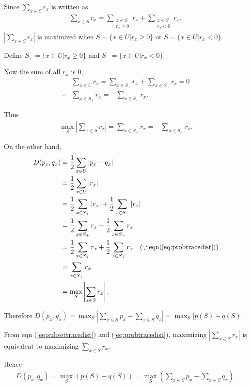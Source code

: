 Since $\sum_{x \in S} r_x $ is written as
\begin{align}
	\sum_{x \in S} r_x = \sum_{\substack{x \in S\\  r_x \geq 0}} r_x + \sum_{\substack{x \in S\\ r_x < 0}} r_x,\label{eq:subsettracedist}
\end{align}
$\left|\sum_{x \in S} r_x \right|$ is maximized when $S = \{x \in U | r_x \geq 0  \}$ or $S = \{x \in U | r_x < 0  \}$.

Define $S_+ = \{x \in U | r_x \geq 0  \}$ and $S_- = \{x \in U | r_x < 0  \}$.

Now the sum of all $r_x$ is 0,
\begin{align*}
	&\sum_{x \in U} r_x = \sum_{x \in S_+} r_x + \sum_{x \in S_-} r_x = 0\\
	\therefore &\sum_{x \in S_+} r_x = - \sum_{x \in S_-} r_x.
\end{align*} 

Thus
\begin{align}
	\max_S \left|\sum_{x \in S} r_x \right| = \sum_{x \in S_+} r_x = - \sum_{x \in S_-} r_x \label{eq:probtracedist}.
\end{align}

On the other hand,
\begin{align}
	D(p_x, q_x) &= \frac{1}{2} \sum_{x \in U} |p_x - q_x|\nonumber\\
		&= \frac{1}{2} \sum_{x \in U} |r_x|\nonumber\\
		&= \frac{1}{2} \sum_{x \in S_+} |r_x| + \frac{1}{2} \sum_{x \in S_-} |r_x|\nonumber\\
		&= \frac{1}{2} \sum_{x \in S_+} r_x - \frac{1}{2} \sum_{x \in S_-} r_x\nonumber\\
		&= \frac{1}{2} \sum_{x \in S_+} r_x + \frac{1}{2} \sum_{x \in S_+} r_x ~~~(\because \text{eqn} (\ref{eq:probtracedist}))\nonumber\\
		&= \sum_{x \in S_+} r_x \nonumber\\
		&= \max_S \left|\sum_{x \in S} r_x \right|.\nonumber
\end{align}

Therefore $D(p_x, q_x) = \max_S \left|\sum_{x \in S} p_x - \sum_{x \in S}q_x \right| = \max_S |p(S) - q(S)|$.

From eqn (\ref{eq:subsettracedist}) and (\ref{eq:probtracedist}), maximizing $\left|\sum_{x \in S} r_x \right|$ is equivalent to 
maximizing $\sum_{x \in S} r_x$.

Hence
\begin{align*}
	D(p_x, q_x) = \max_S (p(S) - q(S)) = \max_S \left(\sum_{x \in S} p_x - \sum_{x \in S}q_x \right).
\end{align*}



